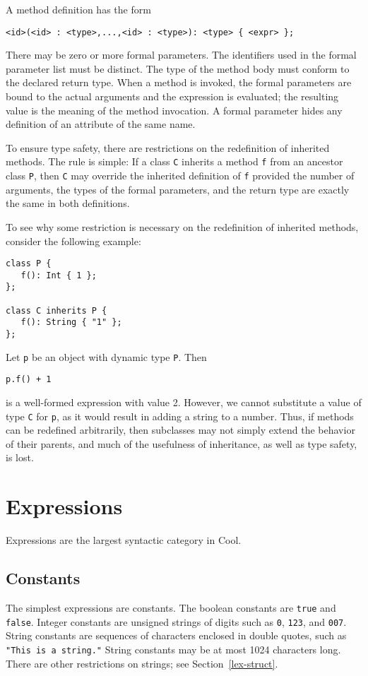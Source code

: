 \documentclass[11pt]{article}
\begin{document}
A method definition has the form
\begin{verbatim}
<id>(<id> : <type>,...,<id> : <type>): <type> { <expr> };
\end{verbatim}
There may be zero or more formal parameters.  The identifiers used
in the formal parameter list must be distinct.  The type of the
method body must conform to the declared return type.  When a method is
invoked, the formal parameters are bound to the actual arguments
and the expression is evaluated; the resulting value is the meaning
of the method invocation.  A formal parameter
hides any definition of an attribute of the same name.  

To ensure type safety, there are restrictions on the redefinition of
inherited methods.  The rule is simple: If a class {\tt C} inherits a
method {\tt f} from an ancestor class {\tt P}, then {\tt C} may
override the inherited definition of {\tt f} provided the number of
arguments, the types of the formal parameters, and the return type are
exactly the same in both definitions.

To see why some restriction is necessary on the redefinition of inherited
methods, consider the following example:
\begin{verbatim}
class P {
   f(): Int { 1 };
};

class C inherits P {
   f(): String { "1" };
};
\end{verbatim}
Let {\tt p} be an object with dynamic type {\tt P}.
Then
\begin{verbatim}
p.f() + 1
\end{verbatim}
is a well-formed expression with value 2.  However, we cannot
substitute a value of type {\tt C} for {\tt p}, as it would result in
adding a string to a number.  Thus, if methods can be 
redefined arbitrarily, then subclasses may not simply extend the behavior of
their parents, and much of the usefulness of inheritance, as well
as type safety, is lost.

\section{Expressions}
\label{sec-expr}

Expressions are the largest syntactic category in Cool.
\subsection{Constants}

The simplest expressions are constants.  The boolean constants are 
{\tt true} and {\tt false}.  Integer constants are unsigned strings of
digits such as {\tt 0}, {\tt 123}, and {\tt 007}.  String constants 
are sequences of characters enclosed in double quotes, such as
{\tt  "This is a string."}  
String constants may be at most 1024 characters long.  There are
other restrictions on strings; see Section~\ref{lex-struct}.
\end{document}
